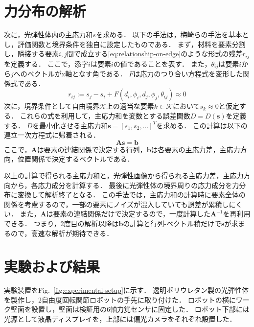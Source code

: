 \documentclass[a4paper,papersize,dvipdfmx]{mtabst}
\newcommand{\figref}[1]{Fig.~\ref{#1}}
\begin{document}
\section{力分布の解析}
次に，光弾性体内の主応力和\(s\)を求める．
以下の手法は，梅崎らの手法\cite{umezaki1987}を基本とし，評価関数と境界条件を独自に設定したものである．
まず，材料を要素分割し，隣接する要素\(i,j\)間で成立する\eqref{eq:relationship-on-edge}のような形式の残差\(r_{ij}\)を定義する．
ここで，添字\(i\)は要素\(i\)の値であることを表す．
また，\(\theta_{ij}\)は要素\(i\)から\(j\)へのベクトルがx軸となす角である．
\(F\)は応力のつり合い方程式を変形した関係式である．
\begin{equation}\label{eq:relationship-on-edge}
    r_{ij}:=s_j-s_i+F(d_i,\phi_i,d_j,\phi_j,\theta_{ij})\approx0
\end{equation}
次に，境界条件として自由境界\(\mathcal{K}\)上の適当な要素\(k\in\mathcal{K}\)において\(s_k\approx0\)と仮定する．
これらの式を利用して，主応力和を変数とする誤差関数\(D=D(\bm{s})\)を定義する．
\(D\)を最小化させる主応力和\(\bm{s}=[s_1,s_2,\ldots]^T\)を求める．
この計算は以下の連立一次方程式に帰着される．
\begin{equation}\label{eq:solve-equation}
    \bm{A}\bm{s}=\bm{b}
\end{equation}
ここで，\(\bm{A}\)は要素の連結関係で決定する行列，\(\bm{b}\)は各要素の主応力差，主応力方向，位置関係で決定するベクトルである．

以上の計算で得られる主応力和と，光弾性画像から得られる主応力差，主応力方向から，各応力成分を計算する．
最後に光弾性体の境界周りの応力成分を力分布に変換して解析終了となる．
この手法では，主応力和の計算時に要素全体の関係を考慮するので，一部の要素にノイズが混入していても誤差が累積しにくい．
また，\(\bm{A}\)は要素の連結関係だけで決定するので，一度計算した\(\bm{A}^{-1}\)を再利用できる．
つまり，2度目の解析以降は\(\bm{b}\)の計算と行列-ベクトル積だけで\(\bm{s}\)が求まるので，高速な解析が期待できる．

\section{実験および結果}
実験装置を\figref{fig:experimental-setup}に示す．
透明ポリウレタン製の光弾性体を製作し，2自由度回転関節ロボットの手先に取り付けた．
ロボットの横にワーク壁面を設置し，壁面は検証用の6軸力覚センサに固定した．
ロボット下部には光源として液晶ディスプレイを，上部には偏光カメラをそれぞれ設置した．
\end{document}
